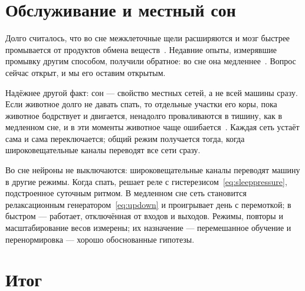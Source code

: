 \section{Обслуживание и местный сон}

Долго считалось, что во сне межклеточные щели расширяются и мозг быстрее промывается от продуктов обмена веществ~\cite{Xie2013}. Недавние опыты, измерявшие промывку другим способом, получили обратное: во сне она медленнее~\cite{Miao2024}. Вопрос сейчас открыт, и мы его оставим открытым.

Надёжнее другой факт: сон --- свойство местных сетей, а не всей машины сразу. Если животное долго не давать спать, то отдельные участки его коры, пока животное бодрствует и двигается, ненадолго проваливаются в тишину, как в медленном сне, и в эти моменты животное чаще ошибается~\cite{Vyazovskiy2011}. Каждая сеть устаёт сама и сама переключается; общий режим получается тогда, когда широковещательные каналы переводят все сети сразу.

\begin{keyblock}
\begin{proposition}
\label{prop:sleep}
Во сне нейроны не выключаются: широковещательные каналы переводят машину в другие режимы. Когда спать, решает реле с гистерезисом~\eqref{eq:sleeppressure}, подстроенное суточным ритмом. В медленном сне сеть становится релаксационным генератором~\eqref{eq:updown} и проигрывает день с перемоткой; в быстром --- работает, отключённая от входов и выходов. Режимы, повторы и масштабирование весов измерены; их назначение --- перемешанное обучение и перенормировка --- хорошо обоснованные гипотезы.
\end{proposition}
\end{keyblock}

\section{Итог}

